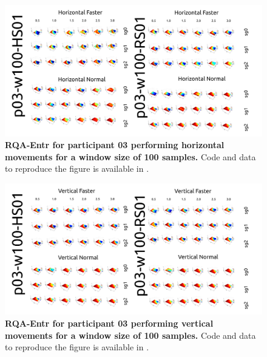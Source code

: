 \documentclass[12pt]{article}
\begin{document}
\newpage
\begin{figure}[ht!]
\centering
\includegraphics[scale=1.0]{figures/rqa/output/epsilons/rqa-epsilonsp03w100Horizontal}
    	\caption{
	{\bf RQA-Entr for participant 03 performing horizontal movements for a window size of 100 samples.}
	Code and data to reproduce the figure is available in \cite{srep2020}.
        }
    \label{fig-p03-H-w100}
\end{figure}
\begin{figure}[hb!]
\centering
\includegraphics[scale=1.0]{figures/rqa/output/epsilons/rqa-epsilonsp03w100Vertical}
    	\caption{
	{\bf RQA-Entr for participant 03 performing vertical movements for a window size of 100 samples.}
	Code and data to reproduce the figure is available in \cite{srep2020}.
        }
    \label{fig-p03-V-w100}
\end{figure}
\end{document}
